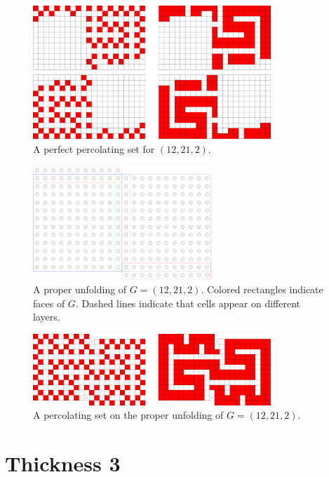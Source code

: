 \begin{figure}[]
\centering
\includegraphics[width=0.8\textwidth]{figures/4/12x21x2.pdf}
\caption{A perfect percolating set for $(12,21,2)$.}
\label{fig:12x21x2}
\end{figure} 

\begin{figure}[]
\centering
\includegraphics[width=0.6\textwidth]{figures/4/12x21x2_unfolded.pdf}
\caption{A proper unfolding of $G= (12,21,2)$. Colored rectangles indicate faces of $G$. Dashed lines indicate that cells appear on different layers. }
\label{fig:12x21x2_unfolded}
\end{figure} 

\begin{figure}[]
\centering
\includegraphics[width=0.8\textwidth]{figures/4/12x21x2_unfolded_lethal.pdf}
\caption{A percolating set on the proper unfolding of $G= (12,21,2)$.}
\label{fig:12x21x2_unfolded_lethal}
\end{figure} 

\section{Thickness 3}

